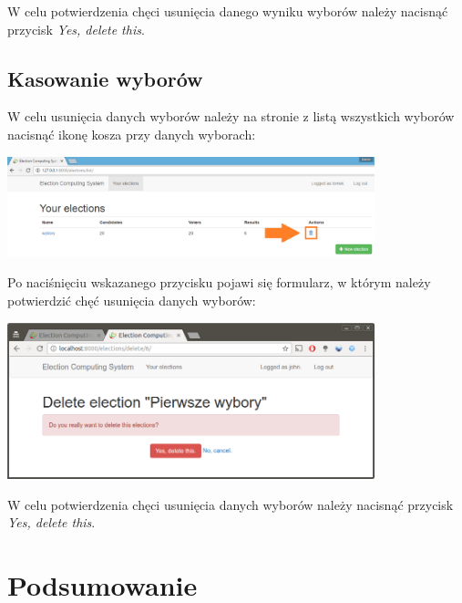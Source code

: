 \documentclass[pdflatex,11pt]{../aghdoc_version2}
\begin{document}
\vspace{\baselineskip}
W celu potwierdzenia chęci usunięcia danego wyniku wyborów należy nacisnąć przycisk \textit{Yes, delete this}.

\section{Kasowanie wyborów}
\label{sec:kasowaniewyborow}

W celu usunięcia danych wyborów należy na stronie z listą wszystkich wyborów nacisnąć ikonę kosza przy danych wyborach: \\

\begin{center}
\includegraphics[width=0.8\textwidth]{pics/delete_election_button.png}
\end{center}

\newpage
Po naciśnięciu wskazanego przycisku pojawi się formularz, w którym należy potwierdzić chęć usunięcia danych wyborów: \\

\begin{center}
\includegraphics[width=0.8\textwidth]{pics/delete-elections.png}
\end{center}

\vspace{\baselineskip}
W celu potwierdzenia chęci usunięcia danych wyborów należy nacisnąć przycisk \textit{Yes, delete this}.

\chapter{Podsumowanie}
\label{cha:podsumowanie}
\end{document}
